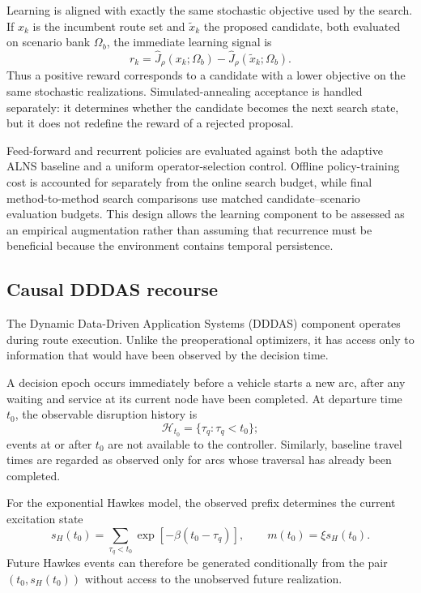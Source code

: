 \documentclass[preprint,12pt]{elsarticle}
\newcommand{\1}{\mathbf{1}}
\begin{document}
Learning is aligned with exactly the same stochastic objective used by the
search. If $x_k$ is the incumbent route set and $\widetilde{x}_k$ the proposed
candidate, both evaluated on scenario bank $\Omega_b$, the immediate learning
signal is
\begin{equation}
	r_k
	=
	\widehat{J}_{\rho}(x_k;\Omega_b)
	-
	\widehat{J}_{\rho}(\widetilde{x}_k;\Omega_b).
	\label{eq:rl_reward}
\end{equation}
Thus a positive reward corresponds to a candidate with a lower objective on the
same stochastic realizations. Simulated-annealing acceptance is handled
separately: it determines whether the candidate becomes the next search state,
but it does not redefine the reward of a rejected proposal.

Feed-forward and recurrent policies are evaluated against both the adaptive ALNS
baseline and a uniform operator-selection control. Offline policy-training cost
is accounted for separately from the online search budget, while final
method-to-method search comparisons use matched candidate--scenario evaluation
budgets. This design allows the learning component to be assessed as an
empirical augmentation rather than assuming that recurrence must be beneficial
because the environment contains temporal persistence.

\subsection{Causal DDDAS recourse}
\label{subsec:dddas}

The Dynamic Data-Driven Application Systems (DDDAS) component
\citep{Darema2004DDDAS} operates during route execution.
Unlike the preoperational optimizers, it has access only to information that
would have been observed by the decision time.

A decision epoch occurs immediately before a vehicle starts a new arc, after
any waiting and service at its current node have been completed. At departure
time $t_0$, the observable disruption history is
\[
\mathcal{H}_{t_0}
=
\{\tau_q:\tau_q<t_0\};
\]
events at or after $t_0$ are not available to the controller.
Similarly, baseline travel times are regarded as observed only for arcs whose
traversal has already been completed.

For the exponential Hawkes model, the observed prefix determines the current
excitation state
\begin{equation}
	s_H(t_0)
	=
	\sum_{\tau_q<t_0}
	\exp[-\beta(t_0-\tau_q)],
	\qquad
	m(t_0)=\xi s_H(t_0).
	\label{eq:conditional_hawkes_state}
\end{equation}
Future Hawkes events can therefore be generated conditionally from the pair
$(t_0,s_H(t_0))$ without access to the unobserved future realization.
\end{document}
